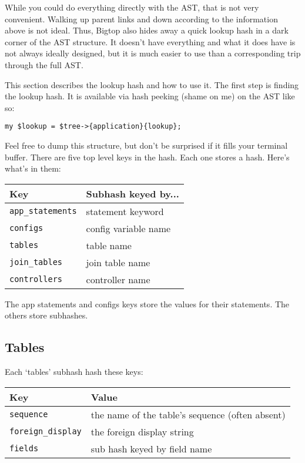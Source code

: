 While you could do everything directly with the AST, that is not very
convenient.  Walking up parent links and down according to the information
above is not ideal.  Thus, Bigtop also hides away a quick lookup hash in a
dark corner of the AST structure.  It doesn't have everything and what it
does have is not always ideally designed, but it is much easier to use than
a corresponding trip through the full AST.

This section describes the lookup hash and how to use it.  The first step
is finding the lookup hash.  It is available via hash peeking (shame on me)
on the AST like so:

\begin{verbatim}
my $lookup = $tree->{application}{lookup};
\end{verbatim}

Feel free to dump this structure, but don't be surprised if it fills your
terminal buffer.  There are five top level keys in the hash.  Each one
stores a hash.  Here's what's in them:

\begin{tabular}{l|l}
Key                   & Subhash keyed by...  \\
\hline
\verb+app_statements+ & statement keyword    \\
\verb+configs+        & config variable name \\
\verb+tables+         & table name           \\
\verb+join_tables+    & join table name      \\
\verb+controllers+    & controller name      \\
\end{tabular}

The app statements and configs keys store the values for their statements.
The others store subhashes.

\subsection*{Tables}

Each `tables' subhash hash these keys:

\begin{tabular}{l|l}
Key                    & Value                                           \\
\hline
\verb+sequence+        & the name of the table's sequence (often absent) \\
\verb+foreign_display+ & the foreign display string                      \\
\verb+fields+          & sub hash keyed by field name                    \\
\end{tabular}

